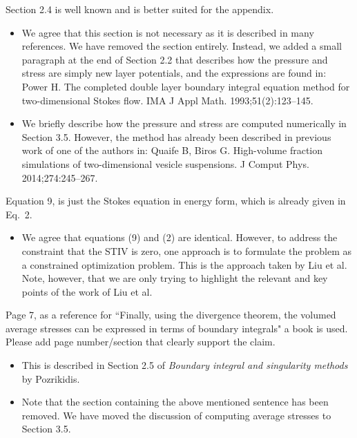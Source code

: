 \documentclass[11pt]{article}
\newcommand{\comment}[1]{{\color{blue} #1}}
\begin{document}
\noindent
\comment{Section 2.4 is well known and is better suited for the
appendix.}
\begin{itemize}
  \item We agree that this section is not necessary as it is described
    in many references.  We have removed the section entirely.  Instead,
    we added a small paragraph at the end of Section 2.2 that describes
    how the pressure and stress are simply new layer potentials, and the
    expressions are found in: \newline
    Power H. The completed double layer boundary integral equation
    method for two-dimensional Stokes flow.  IMA J Appl Math.
    1993;51(2):123--145.

  \item We briefly  describe how the pressure and stress are computed
    numerically in Section 3.5.  However, the method has already been
    described in previous work of one of the authors in: \newline
    Quaife B, Biros G. High-volume fraction simulations of
    two-dimensional vesicle suspensions. J Comput Phys.
    2014;274:245--267.
\end{itemize}


\noindent
\comment{Equation 9, is just the Stokes equation in energy form, which
is already given in Eq.~2.}
\begin{itemize}
  \item We agree that equations (9) and (2) are identical.  However, to
    address the constraint that the STIV is zero, one approach is to
    formulate the problem as a constrained optimization problem.  This
    is the approach taken by Liu et al.  Note, however, that we are only
    trying to highlight the relevant and key points of the work of Liu
    et al.
\end{itemize}

\noindent
\comment{Page 7, as a reference for ``Finally, using the divergence
theorem, the volumed average stresses can be expressed in terms of
boundary integrals" a book is used.  Please add page number/section that
clearly support the claim.}
\begin{itemize}
  \item This is described in Section 2.5 of {\em Boundary integral and
    singularity methods} by Pozrikidis.

  \item Note that the section containing the above mentioned sentence
    has been removed.  We have moved the discussion of computing average
    stresses to Section 3.5.
\end{itemize}
\end{document}
